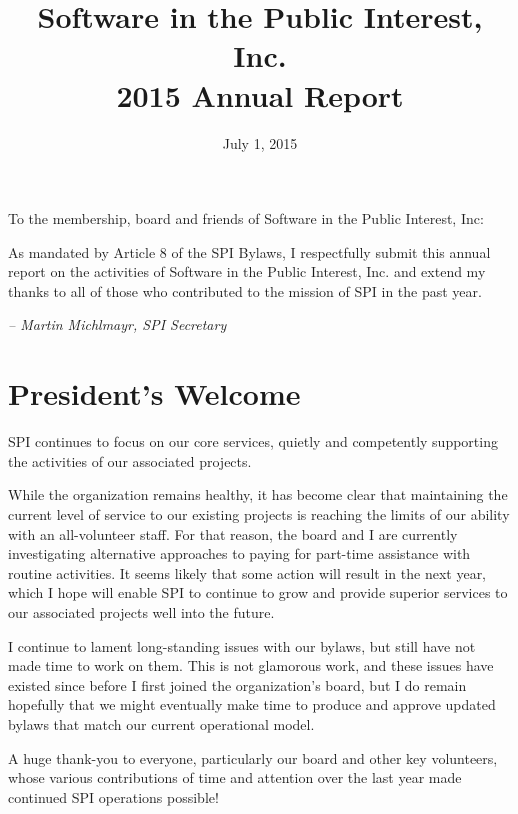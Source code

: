 \documentclass[letterpaper]{report}
\begin{document}
\title{Software in the Public Interest, Inc.\\
2015 Annual Report}
\date{July 1, 2015}

\maketitle

To the membership, board and friends of Software in the Public Interest, Inc:

As mandated by Article 8 of the SPI Bylaws, I respectfully submit this annual
report on the activities of Software in the Public Interest, Inc. and extend my
thanks to all of those who contributed to the mission of SPI in the past year.

  \emph{-- Martin Michlmayr, SPI Secretary}

\newpage

\tableofcontents

\newpage

\chapter{President's Welcome}
\label{sec:president}

SPI continues to focus on our core services, quietly and competently
supporting the activities of our associated projects.

While the organization remains healthy, it has become clear that
maintaining the current level of service to our existing projects is
reaching the limits of our ability with an all-volunteer staff.  For that
reason, the board and I are currently investigating alternative approaches
to paying for part-time assistance with routine activities.  It seems
likely that some action will result in the next year, which I hope will
enable SPI to continue to grow and provide superior services to our
associated projects well into the future.

I continue to lament long-standing issues with our bylaws, but still have
not made time to work on them.  This is not glamorous work, and these
issues have existed since before I first joined the organization's board,
but I do remain hopefully that we might eventually make time to produce and
approve updated bylaws that match our current operational model.

A huge thank-you to everyone, particularly our board and other key
volunteers, whose various contributions of time and attention over the last
year made continued SPI operations possible!
\end{document}
